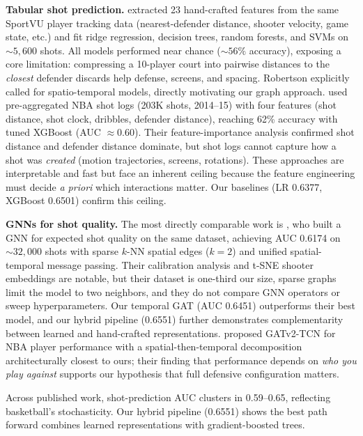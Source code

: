 \documentclass{article}
\begin{document}
\textbf{Tabular shot prediction.}
\citet{robertson2017nba} extracted 23 hand-crafted features from the same SportVU player tracking data (nearest-defender distance, shooter velocity, game state, etc.) and fit ridge regression, decision trees, random forests, and SVMs on ${\sim}5{,}600$ shots. All models performed near chance (${\sim}56\%$ accuracy), exposing a core limitation: compressing a 10-player court into pairwise distances to the \emph{closest} defender discards help defense, screens, and spacing. Robertson explicitly called for spatio-temporal models, directly motivating our graph approach. \citet{oughali2019nba} used pre-aggregated NBA shot logs (203K shots, 2014--15) with four features (shot distance, shot clock, dribbles, defender distance), reaching 62\% accuracy with tuned XGBoost (AUC ${\approx}0.60$). Their feature-importance analysis confirmed shot distance and defender distance dominate, but shot logs cannot capture how a shot was \emph{created} (motion trajectories, screens, rotations). These approaches are interpretable and fast but face an inherent ceiling because the feature engineering must decide \emph{a priori} which interactions matter. Our baselines (LR 0.6377, XGBoost 0.6501) confirm this ceiling.

\textbf{GNNs for shot quality.}
The most directly comparable work is \citet{schmid2025context}, who built a GNN for expected shot quality on the same dataset, achieving AUC 0.6174 on ${\sim}32{,}000$ shots with sparse $k$-NN spatial edges ($k\!=\!2$) and unified spatial-temporal message passing. Their calibration analysis and t-SNE shooter embeddings are notable, but their dataset is one-third our size, sparse graphs limit the model to two neighbors, and they do not compare GNN operators or sweep hyperparameters. Our temporal GAT (AUC 0.6451) outperforms their best model, and our hybrid pipeline (0.6551) further demonstrates complementarity between learned and hand-crafted representations. \citet{gat_tcn2023} proposed GATv2-TCN for NBA player performance with a spatial-then-temporal decomposition architecturally closest to ours; their finding that performance depends on \emph{who you play against} supports our hypothesis that full defensive configuration matters.

Across published work, shot-prediction AUC clusters in 0.59--0.65, reflecting basketball's stochasticity. Our hybrid pipeline (0.6551) shows the best path forward combines learned representations with gradient-boosted trees.

\end{document}

